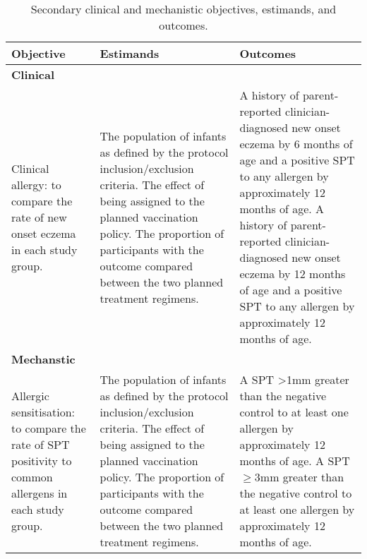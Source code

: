 \documentclass{bmcart}
\begin{document}
\begin{table}[h!]
	\caption{Secondary clinical and mechanistic objectives, estimands, and outcomes.}
	\label{tab:objective-estimands-outcomes-clinical-mechanistic}
	\begin{tabular}{p{4cm}p{4cm}p{4cm}}
		Objective & Estimands & Outcomes \\ \hline
		\textbf{Clinical} & & \\
		Clinical allergy: to compare the rate of new onset eczema in each study group. &
		The population of infants as defined by the protocol inclusion/exclusion criteria.\newline
		The effect of being assigned to the planned vaccination policy.\newline
		The proportion of participants with the outcome compared between the two planned treatment regimens. &
		A history of parent-reported clinician-diagnosed new onset eczema by 6 months of age and a positive SPT to any allergen by approximately 12 months of age.\newline
		A history of parent-reported clinician-diagnosed new onset eczema by 12 months of age and a positive SPT to any allergen by approximately 12 months of age.
		\\
		\textbf{Mechanstic} & & \\
		Allergic sensitisation: to compare the rate of SPT positivity to common allergens in each study group. &
		The population of infants as defined by the protocol inclusion/exclusion criteria.\newline
		The effect of being assigned to the planned vaccination policy.\newline
		The proportion of participants with the outcome compared between the two planned treatment regimens. &
		A SPT >1mm greater than the negative control to at least one allergen by approximately 12 months of age.\newline
		A SPT $\geq$3mm greater than the negative control to at least one allergen by approximately 12 months of age.
		\\
		\hline
	\end{tabular}
\end{table}
\end{document}
